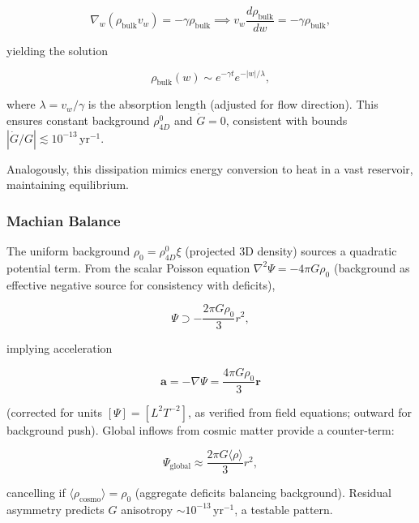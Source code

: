 \[
\nabla_w (\rho_{\text{bulk}} v_w) = -\gamma \rho_{\text{bulk}} \implies v_w \frac{d \rho_{\text{bulk}}}{dw} = -\gamma \rho_{\text{bulk}},
\]

yielding the solution

\begin{equation}
\rho_{\text{bulk}}(w) \sim e^{-\gamma t} e^{-|w| / \lambda},
\end{equation}

where $\lambda = v_w / \gamma$ is the absorption length (adjusted for flow direction). This ensures constant background $\rho_{4D}^0$ and $\dot{G} = 0$, consistent with bounds $|\dot{G}/G| \lesssim 10^{-13} \, \mathrm{yr}^{-1}$.

Analogously, this dissipation mimics energy conversion to heat in a vast reservoir, maintaining equilibrium.

\subsubsection{Machian Balance}
The uniform background $\rho_0 = \rho_{4D}^0 \xi$ (projected 3D density) sources a quadratic potential term. From the scalar Poisson equation $\nabla^2 \Psi = -4\pi G \rho_0$ (background as effective negative source for consistency with deficits),

\[
\Psi \supset -\frac{2\pi G \rho_0}{3} r^2,
\]

implying acceleration

\begin{equation}
\mathbf{a} = -\nabla \Psi = \frac{4\pi G \rho_0}{3} \mathbf{r}
\end{equation}

(corrected for units $[\Psi] = [L^2 T^{-2}]$, as verified from field equations; outward for background push). Global inflows from cosmic matter provide a counter-term:

\begin{equation}
\Psi_{\text{global}} \approx \frac{2\pi G \langle \rho \rangle}{3} r^2,
\end{equation}

cancelling if $\langle \rho_\text{cosmo} \rangle = \rho_0$ (aggregate deficits balancing background). Residual asymmetry predicts $G$ anisotropy $\sim 10^{-13} \, \mathrm{yr}^{-1}$, a testable pattern.

\medskip
{}
